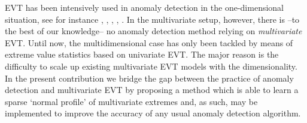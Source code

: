 EVT has been intensively used in anomaly detection in the one-dimensional
situation, see for instance \cite{Roberts99}, \cite{Roberts2000},
\cite{Clifton2011}, \cite{Clifton2008}, \cite{Lee2008}.
In the multivariate setup, however, there is --to the best of our
knowledge--  no anomaly detection method
relying on \textit{multivariate} EVT. Until now, the multidimensional case has only been  tackled by means of extreme value statistics
based on univariate EVT. The major reason is 
the difficulty to scale up existing multivariate EVT models
with the dimensionality.
In the present contribution we bridge the gap between the practice of anomaly detection and multivariate EVT by proposing a method which is
able to learn a sparse `normal profile' of multivariate extremes and,
as such, may be implemented to improve the accuracy of  any usual anomaly detection
algorithm. 
%
%
%
%
